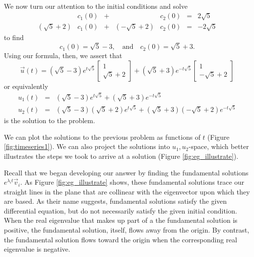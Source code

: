 \documentclass[../book.tex]{subfiles}
\begin{document}
\begin{solution}
We now turn our attention to the initial conditions and solve
\begin{equation}\label{eq:sys-16}
\begin{array}{rccrccr}
                          & c_1(0) & + & & c_2(0) &=& 2\sqrt{5} \\[1ex]
  (\sqrt{5}+2) &c_1(0) & + & (-\sqrt{5}+2) & c_2(0) &=&
  -2\sqrt{5}
\end{array}
\end{equation}
to find
\begin{equation}\label{eq:sys-17}
c_1(0) = \sqrt{5}-3,\quad\text{and}\quad
c_2(0) = \sqrt{5}+3.
\end{equation}
Using our formula, then, we assert that
\begin{equation}\label{eq:sys-18}
\vec{u} (t)
=
(\sqrt{5}-3) 
e^{t\sqrt{5}}  
\begin{bmatrix}
  1 \\ \sqrt{5}+2
\end{bmatrix}
+
(\sqrt{5}+3) 
e^{-t\sqrt{5}}  
\begin{bmatrix}
  1 \\ -\sqrt{5}+2
\end{bmatrix}
\end{equation}
or equivalently
\begin{equation}\label{eq:sys-19}
\begin{array}{lcl}
  u_1(t)
                          &=&
                          (\sqrt{5}-3)  e^{t\sqrt{5}} + 
                          (\sqrt{5}+3)  e^{-t\sqrt{5}}
                          \\[1ex]
                          u_2(t)
                          &=&
                          (\sqrt{5}-3)(\sqrt{5}+2)  e^{t\sqrt{5}} + 
                          (\sqrt{5}+3)(-\sqrt{5}+2)  e^{-t\sqrt{5}}
\end{array}
\end{equation}
is the solution to the problem.
\end{solution}

We can plot the solutions to the previous problem as functions of \(t\) (Figure \ref{fig:timeseries1}). We can also project the solutions into \(u_1,u_2\)-space, which better illustrates the steps we took to arrive at a solution (Figure \ref{fig:eg_illustrate}).

Recall that we began developing our answer by finding the fundamental solutions \(e^{\lambda_i  t} \vec{v}_i\). As Figure \ref{fig:eg_illustrate} shows, these fundamental solutions trace our straight lines in the plane that are collinear with the eigenvector upon which they are based. As their name suggests, fundamental solutions satisfy the given differential equation, but do not necessarily satisfy the given initial condition. When the real eigenvalue that makes up part of a  the fundamental solution is positive, the fundamental solution, itself, flows away from the origin. By contrast, the fundamental solution flows toward the origin when the corresponding real eigenvalue is negative.
\end{document}
